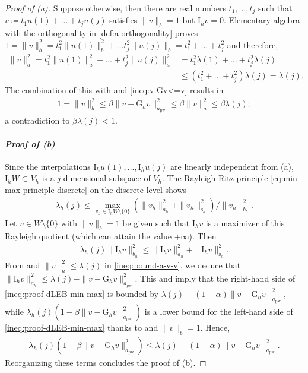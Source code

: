 \documentclass[10pt,a4paper]{amsart}
\newcommand{\I}{\mathrm{I}}
\newcommand{\pw}{\mathrm{pw}}
\newcommand{\s}{\mathrm{s}}
\begin{document}
\begin{proof}[Proof of (a)]
	Suppose otherwise, then there are real numbers $t_1, \dots, t_j$ such that $v \coloneqq t_1 u(1) + \dots + t_ju(j)$ satisfies $\|v\|_b = 1$ but $\I_h v = 0$.
	Elementary algebra with the orthogonality in \eqref{def:a-orthogonality} proves
	$1 = \|v\|_b^2 = t_1^2 \|u(1)\|_b^2 + \dots t_j^2 \|u(j)\|_b = t_1^2 + \dots + t_j^2$ and therefore,
	\begin{align}\label{ineq:bound-a-v-v}
		\|v\|_a^2 = t_1^2 \|u(1)\|^2_a + \dots + t_j^2 \|u(j)\|_a^2 &= t_1^2 \lambda(1) + \dots + t_j^2 \lambda(j)\nonumber\\
		&\leq (t_1^2 + \dots + t_j^2)\lambda(j) = \lambda(j).
	\end{align}
	The combination of this with  and \eqref{ineq:v-Gv<=v} results in
	\begin{align}\label{ineq:proof-dLEB-claim-1}
		1 = \|v\|_b^2 \leq \beta \|v - \mathrm{G}_h v\|_{a_\pw}^2 \leq \beta \|v\|^2_a \leq \beta \lambda(j);
	\end{align}
	a contradiction to $\beta\lambda(j) < 1$.\\[-0.5em]
	
	\paragraph{\emph{Proof of (b)}}
	Since the interpolations $\I_h u(1), \dots, \I_h u(j)$ are linearly independent from (a), $\I_h W \subset V_h$ is a $j$-dimensional subspace of $V_h$.
	The Rayleigh-Ritz principle \eqref{eq:min-max-principle-discrete} on the discrete level shows
	\begin{align*}
		\lambda_h(j) \leq \max_{v_h \in \I_h W\setminus\{0\}} (\|v_h\|_{a_h}^2 + \|v_h\|_{\s_h}^2)/\|v_h\|_{b_h}^2.
	\end{align*}
	Let $v \in W \setminus \{0\}$ with $\|v\|_b = 1$ be given such that $\I_h v$ is a maximizer of this Rayleigh quotient (which can attain the value $+\infty$).
	Then
	\begin{align}\label{ineq:proof-dLEB-min-max}
		\lambda_h(j) \|\I_h v\|_{b_h}^2 \leq \|\I_h v\|_{a_h}^2 + \|\I_h v\|_{\s_h}^2.
	\end{align}
	From  and $\|v\|_a^2 \leq \lambda(j)$ in \eqref{ineq:bound-a-v-v}, we deduce that
	$\|\I_h v\|_{a_h}^2 \leq \lambda(j) - \|v - \mathrm{G}_h v\|_{a_\pw}^2$. This and  imply that the right-hand side of \eqref{ineq:proof-dLEB-min-max} is bounded by $\lambda(j) - (1 - \alpha)\|v - \mathrm{G}_h v\|_{a_\pw}^2$, while $\lambda_h(j)(1 - \beta \|v - \mathrm{G}_h v\|_{a_\pw}^2)$ is a lower bound for the left-hand side of \eqref{ineq:proof-dLEB-min-max} thanks to  and $\|v\|_b = 1$. Hence,
	\begin{align*}
		\lambda_h(j)(1 - \beta \|v - \mathrm{G}_h v\|_{a_\pw}^2) \leq \lambda(j) - (1 - \alpha)\|v - \mathrm{G}_h v\|_{a_\pw}^2.
	\end{align*}
	Reorganizing these terms concludes the proof of (b).
\end{proof}
\end{document}
